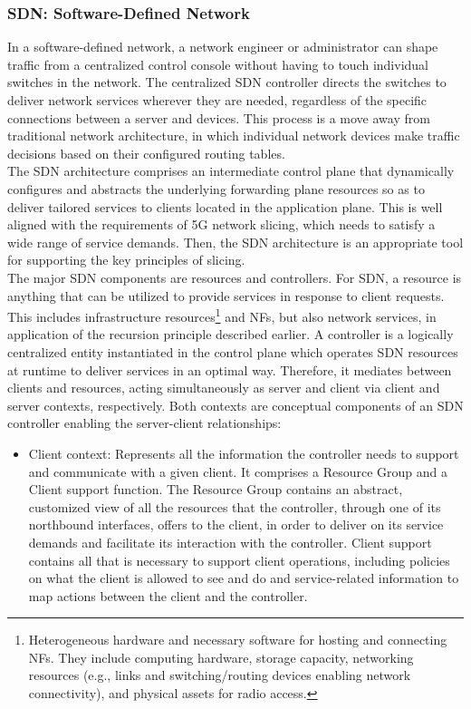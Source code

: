 \documentclass[a4paper,12pt]{report} %
\begin{document}
\subsubsection{SDN: Software-Defined Network}
In a software-defined network, a network engineer or administrator can shape traffic from a centralized control console without having to touch individual switches in the network. The centralized SDN controller directs the switches to deliver network services wherever they are needed, regardless of the specific connections between a server and devices. This process is a move away from traditional network architecture, in which individual network devices make traffic decisions based on their configured routing tables.\\
The SDN architecture comprises an intermediate control plane that dynamically configures and abstracts the underlying
forwarding plane resources so as to deliver tailored services to clients located in the application plane. This is
well aligned with the requirements of 5G network
slicing, which needs to satisfy a wide range of service demands. Then, the SDN architecture is an appropriate
tool for supporting the key principles of slicing.\\
The major SDN components are resources and controllers. For
SDN, a resource is anything that can be utilized to
provide services in response to client requests. This
includes infrastructure resources\footnote{Heterogeneous hardware and necessary software for hosting and connecting NFs. They include computing hardware,
storage capacity, networking resources (e.g., links
and switching/routing devices enabling network
connectivity), and physical assets for radio access.
} and NFs, but also
network services, in application of the recursion
principle described earlier. A controller is a logically centralized entity instantiated in the control
plane which operates SDN resources at runtime
to deliver services in an optimal way. Therefore,
it mediates between clients and resources, acting simultaneously as server and client via client
and server contexts, respectively. Both contexts
are conceptual components of an SDN controller
enabling the server-client relationships:
\begin{itemize}
\item Client context: Represents all the information the
controller needs to support and communicate with
a given client. It comprises a Resource Group and
a Client support function. The Resource Group contains an abstract, customized view of all the resources that the controller, through one of its northbound
interfaces, offers to the client, in order to deliver
on its service demands and facilitate its interaction
with the controller. Client support contains all that
is necessary to support client operations, including
policies on what the client is allowed to see and do and service-related information to map actions
between the client and the controller.
\end{itemize}
\end{document}
